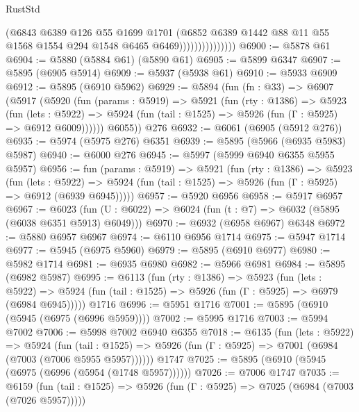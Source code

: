 \begin{lexlean}{RustStd}
\begin{coremodule}
{\begin{coremodule}
{{{{{{{{{{{{{{{{{{{{{{{{{{{{{{{{{{{                              (@6843
                                @6389
                                @126
                                @55
                                @1699
                                @1701
                                (@6852
                                  @6389
                                  @1442
                                  @88
                                  @11
                                  @55
                                  @1568
                                  @1554
                                  @294
                                  @1548
                                  @6465
                                  @6469)))))))))))))))
@6900 := @5878 @61
@6904 := @5880 (@5884 @61) (@5890 @61)
@6905 := @5899 @6347
@6907 := @5895 (@6905 @5914)
@6909 := @5937 (@5938 @61)
@6910 := @5933 @6909
@6912 := @5895 (@6910 @5962)
@6929 := @5894
    (fun (fn : @33) =>
    @6907
      (@5917
        (@5920
          (fun (params : @5919) =>
          @5921
            (fun (rty : @1386) =>
            @5923
              (fun (lets : @5922) =>
              @5924 (fun (tail : @1525) => @5926 (fun (Γ : @5925) => @6912 @6009))))))
        @6055))
    @276
@6932 := @6061 (@6905 (@5912 @276))
@6935 := @5974 (@5975 @276) @6351
@6939 := @5895 (@5966 (@6935 @5983) @5987)
@6940 := @6000 @276
@6945 := @5997 (@5999 @6940 @6355 @5955 @5957)
@6956 := fun (params : @5919) =>
  @5921
    (fun (rty : @1386) =>
    @5923
      (fun (lets : @5922) =>
      @5924 (fun (tail : @1525) => @5926 (fun (Γ : @5925) => @6912 (@6939 @6945)))))
@6957 := @5920 @6956
@6958 := @5917 @6957
@6967 := @6023 (fun (U : @6022) => @6024 (fun (t : @7) => @6032 (@5895 (@6038 @6351 @5913) @6049)))
@6970 := @6932 (@6958 @6967) @6348
@6972 := @5880 @6957 @6967
@6974 := @6110 @6956 @1714
@6975 := @5947 @1714
@6977 := @5945 (@6975 @5960)
@6979 := @5895 (@6910 @6977)
@6980 := @5982 @1714
@6981 := @6935 @6980
@6982 := @5966 @6981
@6984 := @5895 (@6982 @5987)
@6995 := @6113
    (fun (rty : @1386) =>
    @5923
      (fun (lets : @5922) =>
      @5924 (fun (tail : @1525) => @5926 (fun (Γ : @5925) => @6979 (@6984 @6945)))))
    @1716
@6996 := @5951 @1716
@7001 := @5895 (@6910 (@5945 (@6975 (@6996 @5959))))
@7002 := @5995 @1716
@7003 := @5994 @7002
@7006 := @5998 @7002 @6940 @6355
@7018 := @6135
    (fun (lets : @5922) =>
    @5924
      (fun (tail : @1525) => @5926 (fun (Γ : @5925) => @7001 (@6984 (@7003 (@7006 @5955 @5957))))))
    @1747
@7025 := @5895 (@6910 (@5945 (@6975 (@6996 (@5954 (@1748 @5957))))))
@7026 := @7006 @1747
@7035 := @6159
    (fun (tail : @1525) => @5926 (fun (Γ : @5925) => @7025 (@6984 (@7003 (@7026 @5957)))))
}}}}}}}}}}}}}}}}}}}}}}}}}}}}}}}}}}}
\end{coremodule}}
\end{coremodule}
\end{lexlean}
